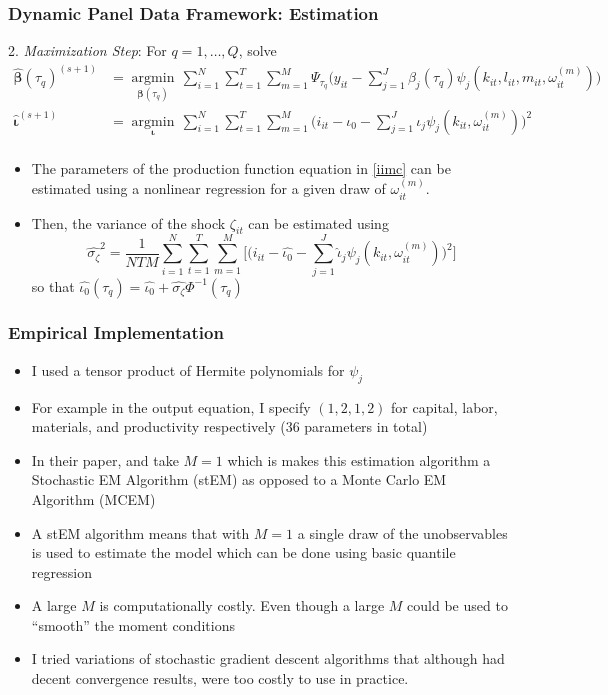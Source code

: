 \documentclass{beamer}
\begin{document}
\begin{frame}
\frametitle{Dynamic Panel Data Framework: Estimation}
2. \textit{Maximization Step}: For $q=1,\dots, Q$, solve
\small
    \begin{equation*}
    \begin{split}
    \hat{\boldsymbol\beta}(\tau_{q})^{(s+1)}&=\underset{\boldsymbol\beta(\tau_{q})}{\operatorname{argmin}}\,\sum_{i=1}^{N}\sum_{t=1}^{T}\sum_{m=1}^{M}\Psi_{\tau_{q}}\bigg(y_{it}-\sum_{j=1}^{J}\beta_{j}(\tau_{q})\psi_{j}(k_{it}, l_{it}, m_{it}, \omega_{it}^{(m)})\bigg)\\
    \hat{\boldsymbol\iota}^{(s+1)}&=\underset{\boldsymbol\iota}{\operatorname{argmin}}\,\sum_{i=1}^{N}\sum_{t=1}^{T}\sum_{m=1}^{M}\bigg(i_{it}-\iota_{0}-\sum_{j=1}^{J}\iota_{j}\psi_{j}(k_{it}, \omega_{it}^{(m)})\bigg)^{2}\\
    \end{split}
    \end{equation*}
\begin{itemize}
	\item The parameters of the production function equation in \eqref{iimc} can be estimated using a nonlinear regression for a given draw of $\omega_{it}^{(m)}$. 
	\item Then, the variance of the shock $\zeta_{it}$ can be estimated using
	\begin{equation}\label{staticivar}
     \hat{\sigma_{\zeta}}^{2}=\frac{1}{NTM}\sum_{i=1}^{N}\sum_{t=1}^{T}\sum_{m=1}^{M}\Bigg[\Bigg(i_{it}-\hat{\iota_{0}}-\sum_{j=1}^{J}\hat{\iota}_{j}\psi_{j}(k_{it}, \omega_{it}^{(m)})\Bigg)^{2}\Bigg]
     \end{equation}
     so that $\hat{\iota_{0}}(\tau_{q})=\hat{\iota_{0}}+\hat{\sigma_{\zeta}}\Phi^{-1}(\tau_{q})$
\end{itemize}
\end{frame}
\begin{frame}
\frametitle{Empirical Implementation}
\begin{itemize}
	\item I used a tensor product of Hermite polynomials for $\psi_{j}$
	\item For example in the output equation, I specify $(1,2,1,2)$ for capital, labor, materials, and productivity respectively (36 parameters in total)
	\item In their paper, \cite{Arellano2016} and \cite{Arellano2017} take $M=1$ which is makes this estimation algorithm a Stochastic EM Algorithm (stEM) as opposed to a Monte Carlo EM Algorithm (MCEM)
	\item A stEM algorithm means that with $M=1$ a single draw of the unobservables is used to estimate the model which can be done using basic quantile regression
	\item A large $M$ is computationally costly. Even though a large $M$ could be used to ``smooth'' the moment conditions
	\item I tried variations of stochastic gradient descent algorithms that although had decent convergence results, were too costly to use in practice.
\end{itemize}
\end{frame}
\end{document}
